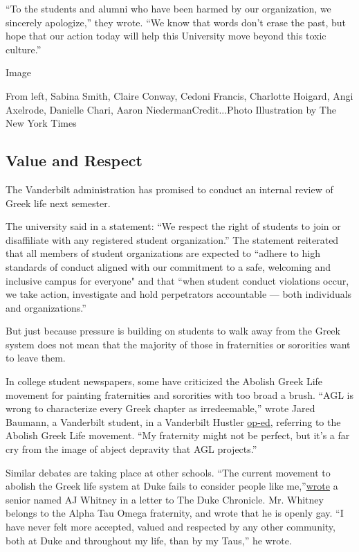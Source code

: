 ``To the students and alumni who have been harmed by our organization,
we sincerely apologize,'' they wrote. ``We know that words don't erase
the past, but hope that our action today will help this University move
beyond this toxic culture.''

Image

From left, Sabina Smith, Claire Conway, Cedoni Francis, Charlotte
Hoigard, Angi Axelrode, Danielle Chari, Aaron NiedermanCredit...Photo
Illustration by The New York Times

\hypertarget{value-and-respect}{%
\subsection{Value and Respect}\label{value-and-respect}}

The Vanderbilt administration has promised to conduct an internal review
of Greek life next semester.

The university said in a statement: ``We respect the right of students
to join or disaffiliate with any registered student organization.'' The
statement reiterated that all members of student organizations are
expected to ``adhere to high standards of conduct aligned with our
commitment to a safe, welcoming and inclusive campus for everyone" and
that ``when student conduct violations occur, we take action,
investigate and hold perpetrators accountable --- both individuals and
organizations.''

But just because pressure is building on students to walk away from the
Greek system does not mean that the majority of those in fraternities or
sororities want to leave them.

In college student newspapers, some have criticized the Abolish Greek
Life movement for painting fraternities and sororities with too broad a
brush. ``AGL is wrong to characterize every Greek chapter as
irredeemable,'' wrote Jared Baumann, a Vanderbilt student, in a
Vanderbilt Hustler
\href{https://vanderbilthustler.com/33363/featured/guest-editorial-how-abolish-greek-life-gets-it-wrong/}{op-ed},
referring to the Abolish Greek Life movement. ``My fraternity might not
be perfect, but it's a far cry from the image of abject depravity that
AGL projects.''

Similar debates are taking place at other schools. ``The current
movement to abolish the Greek life system at Duke fails to consider
people like
me,''\href{https://www.dukechronicle.com/article/2020/07/being-gay-in-greek-life-ato}{wrote}
a senior named AJ Whitney in a letter to The Duke Chronicle. Mr. Whitney
belongs to the Alpha Tau Omega fraternity, and wrote that he is openly
gay. ``I have never felt more accepted, valued and respected by any
other community, both at Duke and throughout my life, than by my Taus,''
he wrote.

